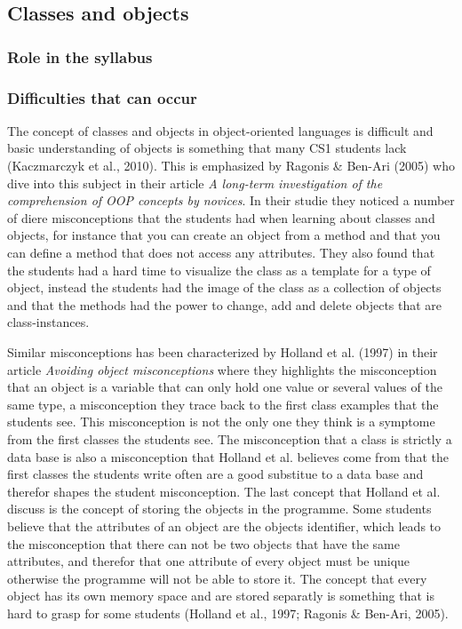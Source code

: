 \subsection{Classes and objects}

\subsubsection{Role in the syllabus}

\subsubsection{Difficulties that can occur}

The concept of classes and objects in object-oriented languages is difficult and basic understanding of objects is something that many CS1 students lack (Kaczmarczyk et al., 2010). This is emphasized by Ragonis \& Ben-Ari (2005) who dive into this subject in their article \emph{A long-term investigation of the comprehension of OOP concepts by novices}. In their studie they noticed a number of diere misconceptions that the students had when learning about classes and objects, for instance that you can create an object from a method and that you can define a method that does not access any attributes. They also found that the students had a hard time to visualize the class as a template for a type of object, instead the students had the image of the class as a collection of objects and that the methods had the power to change, add and delete objects that are class-instances. 

Similar misconceptions has been characterized by Holland et al. (1997) in their article \emph{Avoiding object misconceptions} where they highlights the misconception that an object is a variable that can only hold one value or several values of the same type, a misconception they trace back to the first class examples that the students see. This misconception is not the only one they think is a symptome from the first classes the students see. The misconception that a class is strictly a data base is also a misconception that Holland et al. believes come from that the first classes the students write often are a good substitue to a data base and therefor shapes the student misconception. The last concept that Holland et al. discuss is the concept of storing the objects in the programme. Some students believe that the attributes of an object are the objects identifier, which leads to the misconception that there can not be two objects that have the same attributes, and therefor that one attribute of every object must be unique otherwise the programme will not be able to store it. The concept that every object has its own memory space and are stored separatly is something that is hard to grasp for some students (Holland et al., 1997; Ragonis \& Ben-Ari, 2005). 

